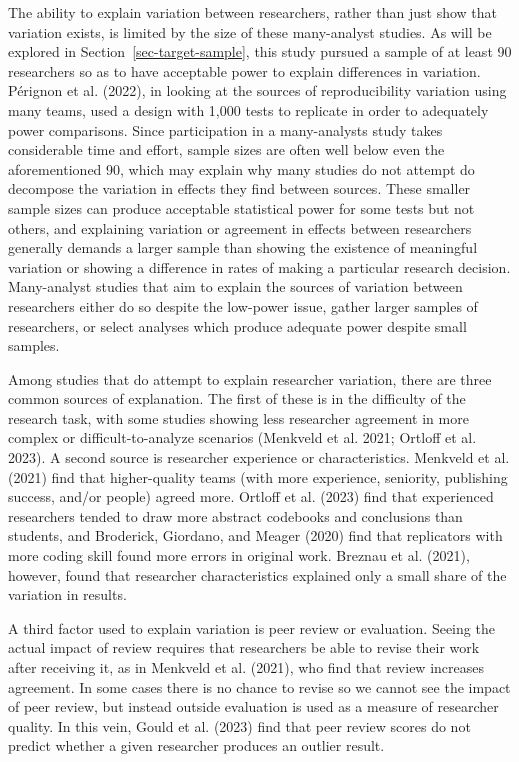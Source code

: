 \documentclass[
  letterpaper,
  DIV=11,
  numbers=noendperiod]{scrartcl}
\begin{document}
The ability to explain variation between researchers, rather than just
show that variation exists, is limited by the size of these many-analyst
studies. As will be explored in Section~\ref{sec-target-sample}, this
study pursued a sample of at least 90 researchers so as to have
acceptable power to explain differences in variation. Pérignon et al.
(2022), in looking at the sources of reproducibility variation using
many teams, used a design with 1,000 tests to replicate in order to
adequately power comparisons. Since participation in a many-analysts
study takes considerable time and effort, sample sizes are often well
below even the aforementioned 90, which may explain why many studies do
not attempt do decompose the variation in effects they find between
sources. These smaller sample sizes can produce acceptable statistical
power for some tests but not others, and explaining variation or
agreement in effects between researchers generally demands a larger
sample than showing the existence of meaningful variation or showing a
difference in rates of making a particular research decision.
Many-analyst studies that aim to explain the sources of variation
between researchers either do so despite the low-power issue, gather
larger samples of researchers, or select analyses which produce adequate
power despite small samples.

Among studies that do attempt to explain researcher variation, there are
three common sources of explanation. The first of these is in the
difficulty of the research task, with some studies showing less
researcher agreement in more complex or difficult-to-analyze scenarios
(Menkveld et al. 2021; Ortloff et al. 2023). A second source is
researcher experience or characteristics. Menkveld et al. (2021) find
that higher-quality teams (with more experience, seniority, publishing
success, and/or people) agreed more. Ortloff et al. (2023) find that
experienced researchers tended to draw more abstract codebooks and
conclusions than students, and Broderick, Giordano, and Meager (2020)
find that replicators with more coding skill found more errors in
original work. Breznau et al. (2021), however, found that researcher
characteristics explained only a small share of the variation in
results.

A third factor used to explain variation is peer review or evaluation.
Seeing the actual impact of review requires that researchers be able to
revise their work after receiving it, as in Menkveld et al. (2021), who
find that review increases agreement. In some cases there is no chance
to revise so we cannot see the impact of peer review, but instead
outside evaluation is used as a measure of researcher quality. In this
vein, Gould et al. (2023) find that peer review scores do not predict
whether a given researcher produces an outlier result.
\end{document}
